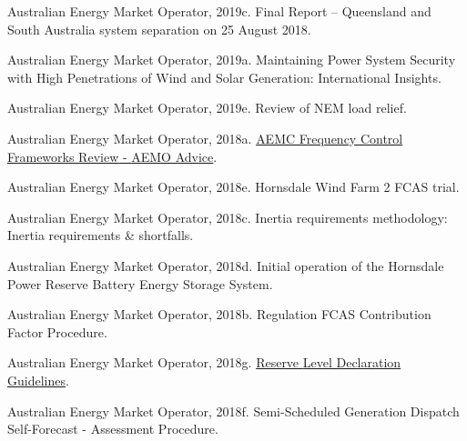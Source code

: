 \documentclass[12pt,a4paper,]{report}
\newlength{\cslhangindent}
\newenvironment{CSLReferences}[2] %
 {%
  \setlength{\parindent}{0pt}
  \ifodd #1 \everypar{\setlength{\hangindent}{\cslhangindent}}\ignorespaces\fi
  \ifnum #2 > 0
  \setlength{\parskip}{#2\baselineskip}
  \fi
 }%
 {}
\begin{document}
\begin{CSLReferences}{1}{0}
\leavevmode{}%
Australian Energy Market Operator, 2019c. Final {Report} -- {Queensland}
and {South Australia} system separation on 25 {August} 2018.

\leavevmode{}%
Australian Energy Market Operator, 2019a. Maintaining {Power System
Security} with {High Penetrations} of {Wind} and {Solar Generation}:
{International Insights}.

\leavevmode{}%
Australian Energy Market Operator, 2019e. Review of {NEM} load relief.

\leavevmode{}%
Australian Energy Market Operator, 2018a.
\href{https://www.aemc.gov.au/sites/default/files/2018-03/Advice\%20from\%20AEMO\%20-\%20Primary\%20frequency\%20control.PDF}{{AEMC
Frequency Control Frameworks Review} - {AEMO Advice}}.

\leavevmode{}%
Australian Energy Market Operator, 2018e. Hornsdale {Wind Farm} 2 {FCAS}
trial.

\leavevmode{}%
Australian Energy Market Operator, 2018c. Inertia requirements
methodology: Inertia requirements \& shortfalls.

\leavevmode{}%
Australian Energy Market Operator, 2018d. Initial operation of the
{Hornsdale Power Reserve Battery Energy Storage System}.

\leavevmode{}%
Australian Energy Market Operator, 2018b. Regulation {FCAS Contribution
Factor Procedure}.

\leavevmode{}%
Australian Energy Market Operator, 2018g.
\href{https://www.aemo.com.au/-/media/files/electricity/nem/security_and_reliability/power_system_ops/reserve-level-declaration-guidelines.pdf?la=en}{Reserve
{Level Declaration Guidelines}}.

\leavevmode{}%
Australian Energy Market Operator, 2018f. Semi-{Scheduled Generation
Dispatch Self-Forecast} - {Assessment Procedure}.


\end{CSLReferences}
\end{document}
